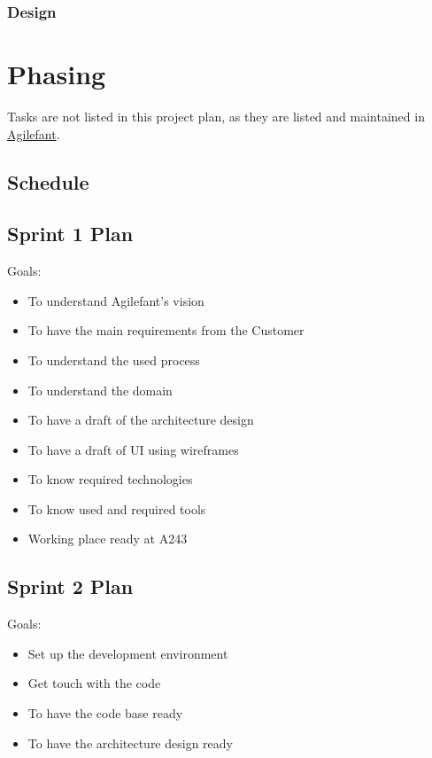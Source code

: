 \subsubsection{Design}



\section{Phasing}

Tasks are not listed in this project plan, as they are listed and maintained in 
\href{https://cloud.agilefant.com/dev/}{Agilefant}.

\subsection{Schedule}



\subsection{Sprint 1 Plan}

Goals:
\begin{itemize}
\item To understand Agilefant's vision
\item To have the main requirements from the Customer
\item To understand the used process
\item To understand the domain
\item To have a draft of the architecture design
\item To have a draft of UI using wireframes
\item To know required technologies
\item To know used and required tools
\item Working place ready at A243
\end{itemize}

\subsection{Sprint 2 Plan}

Goals:
\begin{itemize}
\item Set up the development environment
\item Get touch with the code 
\item To have the code base ready 
\item To have the architecture design ready
\end{itemize}

